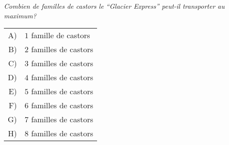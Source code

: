 {%
{\em
Combien de familles de castors le “Glacier Express” peut-il transporter au maximum?


}

\begin{tabular}{ @{} r l @{} }
  A) & $1$ famille de castors \\ 
  B) & $2$ familles de castors \\ 
  C) & $3$ familles de castors \\ 
  D) & $4$ familles de castors \\ 
  E) & $5$ familles de castors \\ 
  F) & $6$ familles de castors \\ 
  G) & $7$ familles de castors \\ 
  H) & $8$ familles de castors
\end{tabular}



}
